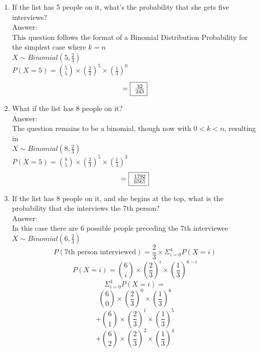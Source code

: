 \documentclass{article}
\begin{document}
\begin{enumerate}
            \begin{enumerate}
                \item   If the list has 5 people on it, what's the probability that she gets five interviews?
                        \\Answer: \\
                        This question follows the format of a Binomial Distribution Probability for the simplest case 
                        where $k = n$ \\
                        $ X \sim Binomial(5,\frac{2}{3}) $\\
                        $ P(X=5) = \binom{5}{5} \times \left(\frac{2}{3}\right)^{5} \times \left(\frac{1}{3}\right)^{0} $
                        $$ = \framebox{ $\frac{32}{243}$} $$
                \item   What if the list has 8 people on it?
                        \\Answer: \\
                        The question remains to be a binomial, though now with $ 0 < k < n$, resulting in\\
                        $ X \sim Binomial(8,\frac{2}{3}) $\\
                        $ P(X=5) = \binom{8}{5} \times \left(\frac{2}{3}\right)^{5} \times \left(\frac{1}{3}\right)^{3} $
                        $$ = \framebox{ $\frac{1792}{6561}$} $$
                \clearpage
                \item   If the list has 8 people on it, and she begins at the top, 
                        what is the probability that she interviews the 7th person?
                        \\Answer:\\
                        In this case there are 6 possible people preceding the 7th interviewee 
                        $ X \sim Binomial(6,\frac{2}{3}) $
                        $$ P(\text{7th person interviewed}) = \frac{2}{3} \times \Sigma_{i=0}^{4}P(X=i) $$
                        $$ P(X=i) = \binom{6}{i} \times \left(\frac{2}{3}\right)^i \times \left(\frac{1}{3}\right)^{6-i} $$
                        $$  \Sigma_{i=0}^{4} P(X=i) = $$ 
                        $$ \binom{6}{0} \times \left(\frac{2}{3}\right)^0 \times \left(\frac{1}{3}\right)^6 $$
                        $$  + \binom{6}{1} \times \left(\frac{2}{3}\right)^1 \times \left(\frac{1}{3}\right)^5 $$
                        $$  + \binom{6}{2} \times \left(\frac{2}{3}\right)^2 \times \left(\frac{1}{3}\right)^4 $$

\end{enumerate}
\end{enumerate}
\end{document}
